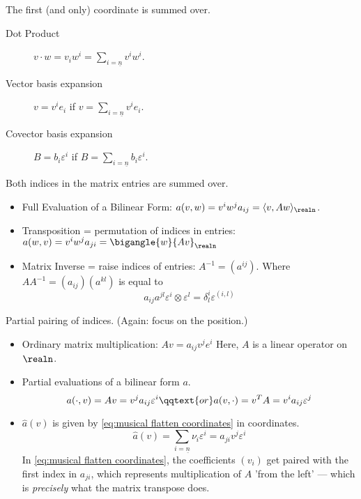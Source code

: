 \documentclass[../main-v2-manifolds.tex]{subfiles}
\begin{document}
The first (and only) coordinate is summed over. 
\begin{description}
    \item[Dot Product] $v\cdot w = v_iw^i = \sum_{i=\underline{n}}v^iw^i$.
    \item[Vector basis expansion] $v = v^ie_i$ if $v = \sum_{i=\underline{n}} v^ie_i$.
    \item[Covector basis expansion] $B = b_i\varepsilon^i$ if $B = \sum_{i=\underline{n}} b_i\varepsilon^i$.
\end{description}
Both indices in the matrix entries are summed over.
\begin{itemize}
    \item Full Evaluation of a Bilinear Form: $a(v,w)= v^iw^ja_{ij}=\langle v,Aw\rangle_\realn $.
    \item Transposition = permutation of indices in entries: $a(w,v) = v^iw^ja_{ji} = \bigangle{w}{Av}_{\realn}$
    \item Matrix Inverse = raise indices of entries: $A^{-1} = (a^{ij})$. Where $AA^{-1} = (a_{ij})(a^{kl})$ is equal to 
    \[
     a_{ij}a^{jl}\varepsilon^i\otimes\varepsilon^l= \delta^{i}_{l}\varepsilon^{(i,l)}
    \]
\end{itemize}
Partial pairing of indices. (Again: focus on the position.)
\begin{itemize}
    \item Ordinary matrix multiplication: $Av = a_{ij}v^je^i$ Here, $A$ is a linear operator on $\realn$. 
    \item Partial evaluations of a bilinear form $a$.
    \[
       a(\cdot, v) = Av = v^ja_{ij}\varepsilon^i\qqtext{or}a(v,\cdot) = v^TA = v^ia_{ij}\varepsilon^j
    \]
    \item $\hat{a}(v)$ is given by \cref{eq:musical flatten coordinates} in coordinates.
    \begin{equation}
        \hat{a}(v) = \sum_{i=\underline{n}}\nu_i\varepsilon^i = a_{ji}v^j\varepsilon^i
        \label{eq:musical flatten coordinates}
    \end{equation}
    In \cref{eq:musical flatten coordinates}, the coefficients $(v_i)$ get paired with the first index in $a_{ji}$, which represents multiplication of $A$ 'from the left' --- which is \emph{precisely} what the matrix transpose does.
\end{itemize}
\end{document}
